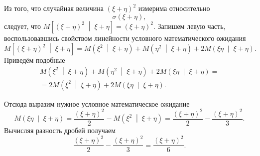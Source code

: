 \begin{enumerate}[label=\alph*)]
  Из того,
  что случайная величина $ \left( \xi + \eta \right)^2$ измерима относительно
  $$ \sigma \left( \xi + \eta \right),$$
  следует,
  что
  $M \left[ \left( \xi + \eta \right)^2 \; \middle| \; \xi + \eta \right] =
    \left( \xi + \eta \right)^2$.
  Запишем левую часть,
  воспользовавшись свойством линейности условного математического ожидания
  $$M \left[ \left( \xi + \eta \right)^2 \; \middle| \; \xi + \eta \right] =
    M \left( \xi^2 \; \middle| \; \xi + \eta \right) +
    M \left( \eta^2 \; \middle| \; \xi + \eta \right) +
    2M \left( \xi \eta \; \middle| \; \xi + \eta \right).$$
  Приведём подобные
  \begin{equation*}
    \begin{split}
      M \left( \xi^2 \; \middle| \; \xi + \eta \right) +
      M \left( \eta^2 \; \middle| \; \xi + \eta \right) +
      2M \left( \xi \eta \; \middle| \; \xi + \eta \right) = \\
      = 2M \left( \xi^2 \; \middle| \; \xi + \eta \right) +
      2M \left( \xi \eta \; \middle| \; \xi + \eta \right).
    \end{split}
  \end{equation*}

  Отсюда выразим нужное условное математическое ожидание
  $$M \left( \xi \eta \; \middle| \; \xi + \eta \right) =
    \frac{ \left( \xi + \eta \right)^2}{2} -
    M \left( \xi^2 \; \middle| \; \xi + \eta \right) =
    \frac{ \left( \xi + \eta \right)^2}{2} - \frac{ \left( \xi + \eta \right)^2}{3}.$$
  Вычисляя разность дробей получаем
  $$ \frac{ \left( \xi + \eta \right)^2}{2} - \frac{ \left( \xi + \eta \right)^2}{3} =
    \frac{ \left( \xi + \eta \right)^2}{6}.$$
\end{enumerate}
